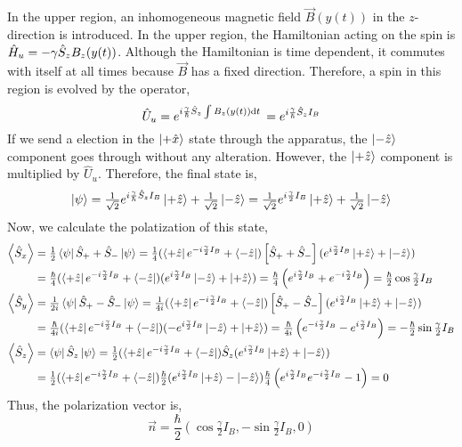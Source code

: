 \documentclass[12pt]{extarticle}
\begin{document}
In the upper region, an inhomogeneous magnetic field $\vec{B}(y(t))$ in the $z$-direction is introduced. In the upper region, the Hamiltonian acting on the spin is $\hat{H}_u = - \gamma \hat{S}_z B_z(y(t))$. Although the Hamiltonian is time dependent, it commutes with itself at all times because $\vec{B}$ has a fixed direction. Therefore, a spin in this region is evolved by the operator, 
\[\hat{U}_u = e^{i \frac{\gamma}{\hbar} \hat{S}_z \int B_z(y(t)) \mathrm{d}t \:} = e^{i \frac{\gamma}{\hbar} \hat{S}_z I_B} \] 
If we send a election in the $\left| + \hat{x} \right>$ state through the apparatus, the $\left| -\hat{z} \right>$ component goes through without any alteration. However, the $\left| + \hat{z} \right>$ component is multiplied by $\hat{U}_u$. Therefore, the final state is,
\[\left| \psi \right> = \tfrac{1}{\sqrt{2}} e^{i \frac{\gamma}{\hbar} \hat{S}_z I_B} \left| + \hat{z} \right> + \tfrac{1}{\sqrt{2}} \left| - \hat{z} \right> = \tfrac{1}{\sqrt{2}} e^{i \frac{\gamma}{2} I_B} \left| + \hat{z} \right> + \tfrac{1}{\sqrt{2}} \left| - \hat{z} \right>\]
Now, we calculate the polatization of this state,
\begin{align*}
\left< \hat{S}_x \right> & = \tfrac{1}{2} \left< \psi \right| \hat{S}_{+} + \hat{S}_{-} \left| \psi \right> = \tfrac{1}{4} (  \left< + \hat{z} \right| e^{-i \frac{\gamma}{2} I_B} + \left< - \hat{z} \right|) \left[ \hat{S}_{+} + \hat{S}_{-} \right] (  e^{i \frac{\gamma}{2} I_B} \left| + \hat{z} \right>  + \left| - \hat{z} \right>) \\ 
& = \tfrac{\hbar}{4} (  \left< + \hat{z} \right| e^{-i \frac{\gamma}{2} I_B} + \left< - \hat{z} \right|) (  e^{i \frac{\gamma}{2} I_B} \left| - \hat{z} \right>  + \left| + \hat{z} \right>) = \tfrac{\hbar}{4} \left( e^{i \frac{\gamma}{2} I_B} + e^{-i \frac{\gamma}{2} I_B} \right) = \tfrac{\hbar}{2} \cos{ \tfrac{\gamma}{2} I_B} \\
\left< \hat{S}_y \right> & = \tfrac{1}{2i} \left< \psi \right| \hat{S}_{+} - \hat{S}_{-} \left| \psi \right> = \tfrac{1}{4i} (  \left< + \hat{z} \right| e^{-i \frac{\gamma}{2} I_B} + \left< - \hat{z} \right|) \left[ \hat{S}_{+} - \hat{S}_{-} \right] (  e^{i \frac{\gamma}{2} I_B} \left| + \hat{z} \right>  + \left| - \hat{z} \right>) \\ 
& = \tfrac{\hbar}{4i} (  \left< + \hat{z} \right| e^{-i \frac{\gamma}{2} I_B} + \left< - \hat{z} \right|) ( - e^{i \frac{\gamma}{2} I_B} \left| - \hat{z} \right>  + \left| + \hat{z} \right>) = \tfrac{\hbar}{4i} \left( e^{-i \frac{\gamma}{2} I_B} - e^{i \frac{\gamma}{2} I_B} \right) = -\tfrac{\hbar}{2} \sin{ \tfrac{\gamma}{2} I_B} \\
\left< \hat{S}_z \right> & = \left< \psi \right| \hat{S}_{z} \left| \psi \right> = \tfrac{1}{2} (\left< + \hat{z} \right| e^{-i \frac{\gamma}{2} I_B} + \left< - \hat{z} \right|) \hat{S}_{z} (e^{i \frac{\gamma}{2} I_B} \left| + \hat{z} \right>  + \left| - \hat{z} \right>) \\ 
& = \tfrac{1}{2} (\left< + \hat{z} \right| e^{-i \frac{\gamma}{2} I_B} + \left< - \hat{z} \right|) \tfrac{\hbar}{2} (e^{i \frac{\gamma}{2} I_B} \left| + \hat{z} \right>  - \left| - \hat{z} \right>) \tfrac{\hbar}{4} \left( e^{i \frac{\gamma}{2} I_B} e^{-i \frac{\gamma}{2} I_B}  - 1 \right) = 0 \\
\end{align*}
Thus, the polarization vector is,
\[\vec{n} = \frac{\hbar}{2} \left(\cos{\tfrac{\gamma}{2} I_B}, -\sin{\tfrac{\gamma}{2} I_B}, 0 \right)\]
\end{document}
